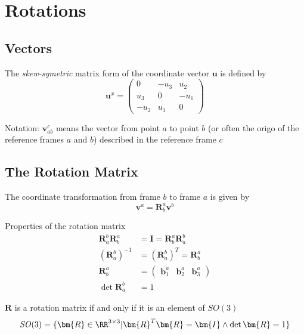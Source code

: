 \section{Rotations}

\setcounter{section}{6}
\setcounter{subsection}{1}
\subsection{Vectors} %

The \textit{skew-symetric} matrix form of the coordinate vector $\mathbf{u}$ is defined by
\[\mathbf{u}^x=\begin{pmatrix}
    0    & -u_3 & u_2 \\
    u_3  & 0    & -u_1 \\
    -u_2 & u_1  & 0 
\end{pmatrix}\]

Notation: \(\bm{v}_{ab}^c\) means the vector from point \(a\) to point \(b\) (or often the origo of the reference frames \(a\) and \(b\)) described in the reference frame \(c\)
\newline

\setcounter{subsection}{3}
\subsection{The Rotation Matrix} %

The coordinate transformation from frame \(\mathit{b}\) to frame \(\mathit{a}\) is given by
\[
\bm{v}^a = \bm{R}_b^a\bm{v}^b
\]

Properties of the rotation matrix
\begin{align*}
    \bm{R}_a^b \bm{R}_b^a &= \bm{I}=  \bm{R}_b^a \bm{R}_a^b\\
    (\bm{R}_a^b)^{-1} &= (\bm{R}_a^b)^{T} = \bm{R}_b^a \\
    \bm{R}_b^a &= \begin{pmatrix}\bm{b}_1^a& \bm{b}_2^a& \bm{b}_3^a\end{pmatrix} \\
    \det{\bm{R}_a^b} &= 1
\end{align*}

\(\bm{R}\) is a rotation matrix if and only if it is an element of \(\mathit{SO}(3)\)
\[\mathit{SO}(3) = \{\bm{R} \in \RR^{3\times3} | \bm{R}^T\bm{R} = \bm{I} \wedge \det \bm{R} = 1\}\]

